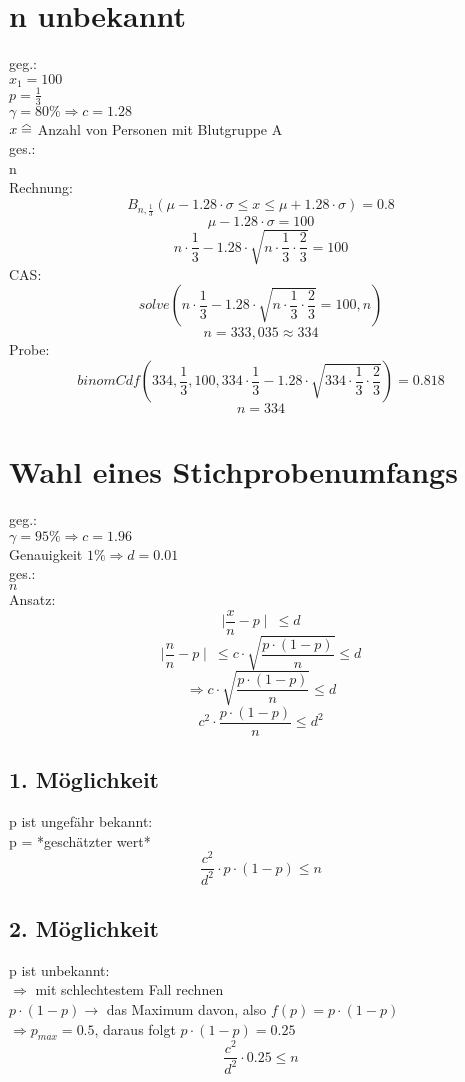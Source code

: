 \documentclass[a4paper,12pt]{article}
\newcommand\equalhat{\mathrel{\stackon[1.5pt]{=}{\stretchto{%
    \scalerel*[\widthof{=}]{\wedge}{\rule{1ex}{3ex}}}{0.5ex}}}}
\begin{document}
\section{n unbekannt}
geg.:\\
$x_{1} = 100$\\
$p = \frac{1}{3}$\\
$\gamma = 80\% \Rightarrow c = 1.28$\\
$x \equalhat$ Anzahl von Personen mit Blutgruppe A\\
ges.:\\
n\\
Rechnung:\\
$$B_{n, \frac{1}{3}}(\mu - 1.28 \cdot \sigma \leq x \leq \mu + 1.28 \cdot \sigma) = 0.8$$
$$\mu - 1.28 \cdot \sigma = 100$$
$$n \cdot \frac{1}{3} - 1.28 \cdot \sqrt{n \cdot \frac{1}{3} \cdot \frac{2}{3}} = 100$$
CAS:\\
$$solve(n \cdot \frac{1}{3} - 1.28 \cdot \sqrt{n \cdot \frac{1}{3} \cdot \frac{2}{3}} = 100, n)$$
$$n = 333,035 \approx 334$$
Probe:\\
$$binomCdf(334,\frac{1}{3}, 100, 334 \cdot \frac{1}{3} - 1.28 \cdot \sqrt{334 \cdot \frac{1}{3} \cdot \frac{2}{3}}) = 0.818$$
$$n = 334$$
\pagebreak
\section{Wahl eines Stichprobenumfangs}
geg.:\\
$\gamma = 95\% \Rightarrow c = 1.96$\\
Genauigkeit $1\% \Rightarrow d = 0.01$\\
ges.:\\
$n$\\
Ansatz:\\
$$\mid \frac{x}{n} - p \mid\ \leq d$$
$$\mid \frac{n}{n} - p \mid\ \leq c \cdot \sqrt{\frac{p \cdot (1 - p)}{n}} \leq d$$
$$\Rightarrow c \cdot \sqrt{\frac{p \cdot (1 - p)}{n}} \leq d$$
$$c^{2} \cdot \frac{p \cdot (1 - p)}{n} \leq d^{2}$$
\subsection{1. Möglichkeit}
p ist ungefähr bekannt:\\
p = *geschätzter wert*\\
$$\frac{c^{2}}{d^{2}} \cdot p \cdot(1 - p) \leq n$$
\subsection{2. Möglichkeit}
p ist unbekannt:\\
$\Rightarrow$ mit schlechtestem Fall rechnen\\
$p \cdot (1 - p) \rightarrow$ das Maximum davon, also $f(p) = p \cdot (1 - p)$\\
$\Rightarrow p_{max} = 0.5$, daraus folgt $p \cdot (1 - p) = 0.25$\\
$$\frac{c^{2}}{d^{2}} \cdot 0.25 \leq n$$ 
\end{document}
